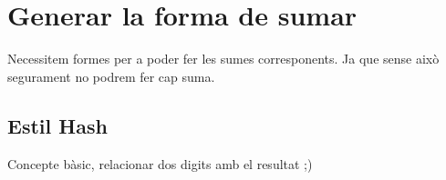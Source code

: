 

\section{Generar la forma de sumar}

Necessitem formes per a poder fer les sumes corresponents.
Ja que sense això segurament no podrem fer cap suma.
\subsection{Estil Hash}
Concepte bàsic, relacionar dos digits amb el resultat ;)


